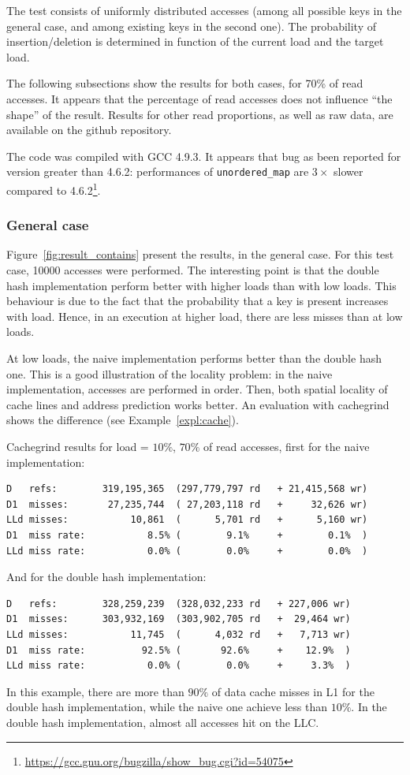 \documentclass[oneside]{article}
\begin{document}
The test consists of uniformly distributed accesses (among all possible keys in the general case, and among existing keys in the second one). The probability of insertion/deletion is determined in function of the current load and the target load.

The following subsections show the results for both cases, for 70\% of read accesses. It appears that the percentage of read accesses does not influence ``the shape'' of the result. Results for other read proportions, as well as raw data, are available on the github repository.

The code was compiled with GCC 4.9.3. It appears that bug as been reported for version greater than 4.6.2: performances of \texttt{unordered\_map} are $3\times$ slower compared to 4.6.2\footnote{\url{https://gcc.gnu.org/bugzilla/show_bug.cgi?id=54075}}.
\subsubsection{General case}
Figure~\ref{fig:result_contains} present the results, in the general case. For this test case, 10000 accesses were performed. The interesting point is that the double hash implementation perform better with higher loads than with low loads. This behaviour is due to the fact that the probability that a key is present increases with load. Hence, in an execution at higher load, there are less misses than at low loads. 

At low loads, the naive implementation performs better than the double hash one. This is a good illustration of the locality problem: in the naive implementation, accesses are performed in order. Then, both spatial locality of cache lines and address prediction works better. An evaluation with cachegrind shows the difference (see Example~\ref{expl:cache}).
\begin{example}
	\label{expl:cache}
Cachegrind results for load = $10\%$, $70\%$ of read accesses, first for the naive implementation: 
	\begin{verbatim}
D   refs:        319,195,365  (297,779,797 rd   + 21,415,568 wr)
D1  misses:       27,235,744  ( 27,203,118 rd   +     32,626 wr)
LLd misses:           10,861  (      5,701 rd   +      5,160 wr)
D1  miss rate:           8.5% (        9.1%     +        0.1%  )
LLd miss rate:           0.0% (        0.0%     +        0.0%  )
	\end{verbatim}
And for the double hash implementation: 
	\begin{verbatim}
D   refs:        328,259,239  (328,032,233 rd   + 227,006 wr)
D1  misses:      303,932,169  (303,902,705 rd   +  29,464 wr)
LLd misses:           11,745  (      4,032 rd   +   7,713 wr)
D1  miss rate:          92.5% (       92.6%     +    12.9%  )
LLd miss rate:           0.0% (        0.0%     +     3.3%  )
	\end{verbatim}

In this example, there are more than $90\%$ of data cache misses in L1 for the double hash implementation, while the naive one achieve less than $10\%$. In the double hash implementation, almost all accesses hit on the LLC.
\end{example}
\end{document}
